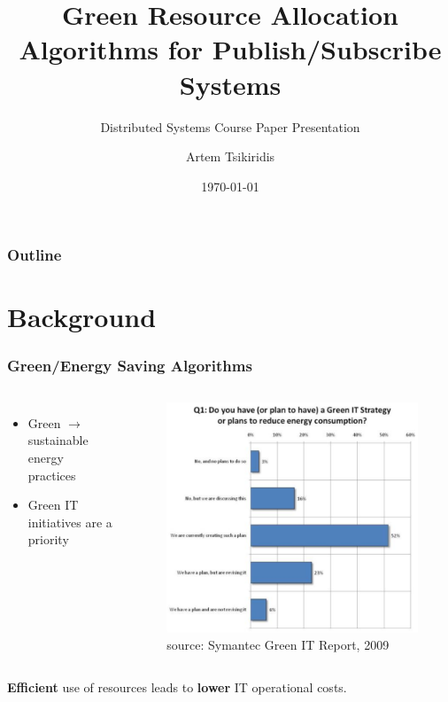 \documentclass{beamer}
\title{Green Resource Allocation Algorithms for Publish/Subscribe Systems}
\subtitle{Distributed Systems Course Paper Presentation}
\author{Artem Tsikiridis}
\institute{cs.grad.aueb}
\date{\today}
\begin{document}
\begin{frame}
\titlepage
\end{frame}

\begin{frame}
\frametitle{Outline}
\tableofcontents	
\end{frame}

\section{Background}
\begin{frame}
\frametitle{Green/Energy Saving Algorithms}

\begin{columns}
\begin{itemize}
\item Green $\rightarrow$ sustainable energy practices
\item Green IT initiatives are a priority
\end{itemize}

\begin{figure}
\includegraphics[scale=0.25]{energy_plan_symantec.png}
\caption{source: Symantec Green IT Report, 2009}
\end{figure}

\end{columns}

\textbf{Efficient} use of resources leads to \textbf{lower} IT operational costs.
\end{frame}
\end{document}
